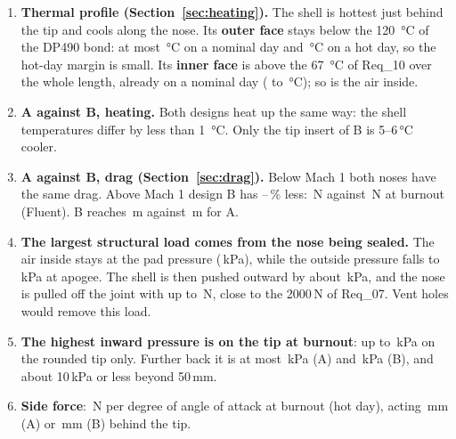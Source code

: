 \begin{keybox}
\begin{enumerate}[leftmargin=*, itemsep=4pt]
\item \textbf{Thermal profile (Section~\ref{sec:heating}).} The shell is hottest just behind the tip and
cools along the nose. Its \textbf{outer face} stays below the \SI{120}{\celsius} of the DP490 bond: at
most \,\si{\celsius} on a nominal day and \,\si{\celsius}
on a hot day, so the hot-day margin is small. Its \textbf{inner face} is above the \SI{67}{\celsius} of
Req\_10 over the whole length, already on a nominal day ( to
\,\si{\celsius}); so is the air inside.
\item \textbf{A against B, heating.} Both designs heat up the same way: the shell temperatures differ by
less than \SI{1}{\celsius}. Only the tip insert of B is 5--6\,\si{\celsius} cooler.
\item \textbf{A against B, drag (Section~\ref{sec:drag}).} Below Mach 1 both noses have the same drag.
Above Mach 1 design B has --\,\% less: \,N against
\,N at burnout (Fluent). B reaches \,m against \,m for A.
\item \textbf{The largest structural load comes from the nose being sealed.} The air inside stays at the
pad pressure (\,kPa), while the outside pressure falls to \,kPa at
apogee. The shell is then pushed outward by about \,kPa, and the nose is pulled
off the joint with up to \,N, close to the 2000\,N of Req\_07. Vent holes would remove
this load.
\item \textbf{The highest inward pressure is on the tip at burnout}: up to \,kPa on
the rounded tip only. Further back it is at most \,kPa (A) and
\,kPa (B), and about 10\,kPa or less beyond 50\,mm.
\item \textbf{Side force}: \,N per degree of angle of attack at burnout (hot day),
acting \,mm (A) or \,mm (B) behind the tip.
\end{enumerate}
\end{keybox}

